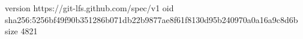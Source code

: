 version https://git-lfs.github.com/spec/v1
oid sha256:5256bf49f90b351286b071db22b9877ae8f61f8130d95b240970a0a16a9c8d6b
size 4821

